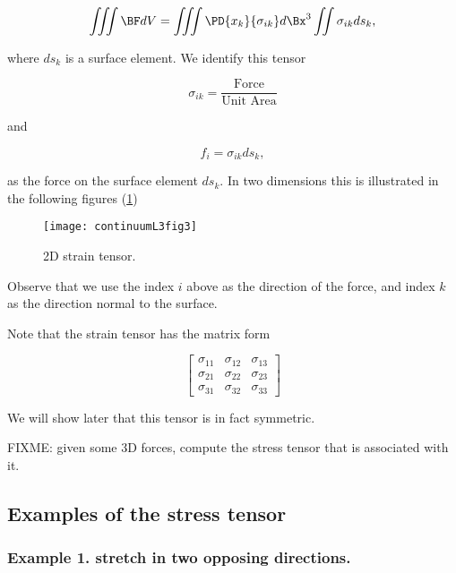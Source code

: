 \begin{equation}\label{eqn:continuumL3:290}
\iiint \BF dV 
= \iiint \PD{x_k}{\sigma_{ik}} d\Bx^3 
\iint \sigma_{ik} ds_k,
\end{equation}

where $ds_k$ is a surface element.  We identify this tensor

\begin{equation}\label{eqn:continuumL3:310}
\sigma_{ik} = \frac{\text{Force}}{\text{Unit Area}}
\end{equation}

and 

\begin{equation}\label{eqn:continuumL3:330}
f_i = \sigma_{ik} ds_k,
\end{equation}

as the force on the surface element $ds_k$.  In two dimensions this is illustrated in the following figures (\ref{fig:continuumL3:continuumL3fig3})
\begin{figure}[htp]
   \centering
   \texttt{[image: continuumL3fig3]}
   \caption{2D strain tensor.}\label{fig:continuumL3:continuumL3fig3}
\end{figure}

Observe that we use the index $i$ above as the direction of the force, and index $k$ as the direction normal to the surface.

Note that the strain tensor has the matrix form

\begin{equation}\label{eqn:continuumL3:350}
\begin{bmatrix}
\sigma_{11} & \sigma_{12} & \sigma_{13} \\
\sigma_{21} & \sigma_{22} & \sigma_{23} \\
\sigma_{31} & \sigma_{32} & \sigma_{33}
\end{bmatrix}
\end{equation}

We will show later that this tensor is in fact symmetric.

FIXME: given some 3D forces, compute the stress tensor that is associated with it.

\subsection{Examples of the stress tensor}

\subsubsection{Example 1.  stretch in two opposing directions.}

